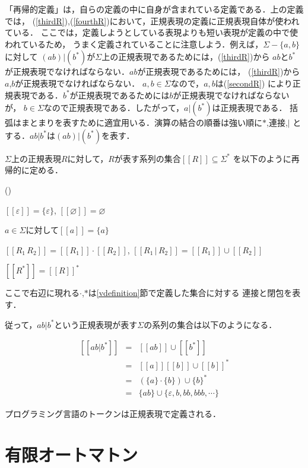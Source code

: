 \documentclass[a4j,dvipdfmx]{jbook}
\begin{document}
「再帰的定義」は，自らの定義の中に自身が含まれている定義である．上の定義では，
(\ref{thirdR}),(\ref{fourthR})において，正規表現の定義に正規表現自体が使われている．
ここでは，定義しようとしている表現よりも短い表現が定義の中で使われているため，
うまく定義されていることに注意しよう．例えば，$\Sigma-\{a,b\}$に対して
$(ab)|(b^\ast)$が$\Sigma$上の正規表現であるためには，(\ref{thirdR})から
$ab$と$b^\ast$が正規表現でなければならない．$ab$が正規表現であるためには，
(\ref{thirdR})から$a$,$b$が正規表現でなければならない．
$a,b\in\Sigma$なので，$a,b$は(\ref{secondR})
により正規表現である．$b^\ast$が正規表現であるためには$b$が正規表現でなければならないが，
$b\in\Sigma$なので正規表現である．したがって，$a|(b^\ast)$は正規表現である．
括弧はまとまりを表すために適宜用いる．演算の結合の順番は強い順に$\ast$,連接,$|$
とする．$ab|b^\ast$は$(ab)|(b^\ast)$を表す．

\begin{Def}
  $\Sigma$上の正規表現$R$に対して，$R$が表す系列の集合$[\![R]\!]\subseteq\Sigma^\ast$
  を以下のように再帰的に定める．
  \begin{list}{()}{}
    \item $[\![\varepsilon]\!]=\{\varepsilon\}$, $[\![\varnothing]\!]=\varnothing$
    \item $a\in\Sigma$に対して$[\![a]\!]=\{a\}$
    \item $[\![R_1\,R_2]\!]=[\![R_1]\!]\cdot[\![R_2]\!]$, $[\![R_1\,|\,R_2]\!]=
    [\![R_1]\!]\cup[\![R_2]\!]$
    \item $[\![R^\ast]\!]=[\![R]\!]^\ast$
  \end{list}
  ここで右辺に現れる$\cdot$,$\ast$は\ref{vdefinition}節で定義した集合に対する
  連接と閉包を表す．
\end{Def}

従って，$ab|b^\ast$という正規表現が表す$\Sigma$の系列の集合は以下のようになる．

\[\begin{array}{rcl}[\![ab|b^\ast]\!] & = & [\![ab]\!]\cup[\![b^\ast]\!]\\
  & = & [\![a]\!][\![b]\!]\cup [\![b]\!]^\ast\\
  & = & (\{a\}\cdot\{b\})\cup\{b\}^\ast\\
  & = & \{ab\}\cup\{\varepsilon,b,bb,bbb,\cdots\}
\end{array}\]

プログラミング言語のトークンは正規表現で定義される．

\section{有限オートマトン}
\end{document}
